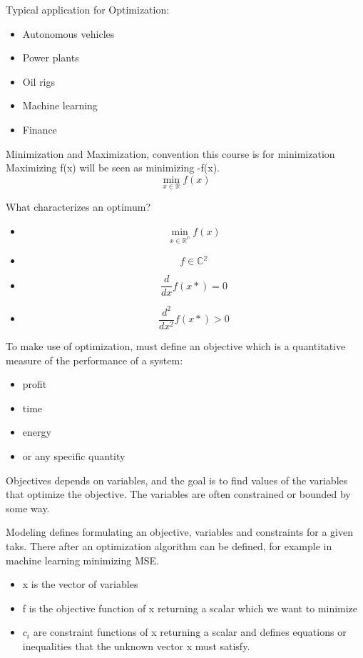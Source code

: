 Typical application for Optimization:
\begin{itemize}
    \item Autonomous vehicles
    \item Power plants
    \item Oil rigs
    \item Machine learning
    \item Finance
\end{itemize}

Minimization and Maximization, convention this course is for minimization
Maximizing f(x) will be seen as minimizing -f(x).
\begin{equation}
        \min_{x \in \mathbb{R}} f(x)
\end{equation}

What characterizes an optimum?
\begin{itemize}
\item \[\min_{x \in \mathbb{R^n}} f(x)\]
\item \[f \in \mathbb{C{^2}}\]
\item \[ \frac{d}{dx} f(x*) = 0\]
\item \[ \frac{d^2}{dx^2} f(x*) > 0\]
\end{itemize}

To make use of optimization, must define an objective which is a quantitative
measure of the performance of a system:
\begin{itemize}
    \item profit
    \item time
    \item energy
    \item or any specific quantity
\end{itemize}
Objectives depends on variables, and the goal is to find values  of the variables that 
optimize the objective. The variables are often constrained or bounded by some way.

Modeling defines formulating an objective, variables and constraints for a given taks.
There after an optimization algorithm can be defined, for example in machine learning minimizing MSE.

\begin{itemize}
    \item x is the vector of variables
    \item f is the objective function of x returning a scalar which we want to minimize
    \item $c_i$ are constraint functions of x returning a scalar and defines equations or inequalities that the unknown vector x must satisfy.
\end{itemize}


